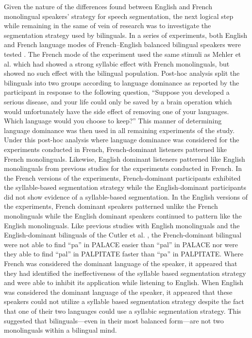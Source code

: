 \documentclass[
12pt, %
english, %
doublespacing, %
nolistspacing, %
liststotoc, %
headsepline, %
chapterinoneline, %
openany, %
]{DoctoralThesis}\usepackage[]{graphicx}\usepackage[]{color}
\begin{document}
Given the nature of the differences found between English and French monolingual speakers’ strategy for speech segmentation, the next logical step while remaining in the same of vein of research was to investigate the segmentation strategy used by bilinguals. In a series of experiments, both English and French language modes of French–English balanced bilingual speakers were tested \parencite{Cutler1992-qq}. The French mode of the experiment used the same stimuli as Mehler et al. \parencite*{Mehler1981-vi} which had showed a strong syllabic effect with French monolinguals, but showed no such effect with the bilingual population. Post-hoc analysis split the bilinguals into two groups according to language dominance as reported by the participant in response to the following question, “Suppose you developed a serious disease, and your life could only be saved by a brain operation which would unfortunately have the side effect of removing one of your languages. Which language would you choose to keep?” This manner of determining language dominance was then used in all remaining experiments of the study. Under this post-hoc analysis where language dominance was considered for the experiments conducted in French, French-dominant listeners patterned like French monolinguals. Likewise, English dominant listeners patterned like English monolinguals from previous studies for the experiments conducted in French. In the French versions of the experiments, French-dominant participants exhibited the syllable-based segmentation strategy while the English-dominant participants did not show evidence of a syllable-based segmentation.  In the English versions of the experiments, French dominant speakers patterned unlike the French monolinguals while the English dominant speakers continued to pattern like the English monolinguals. Like previous studies with English monolinguals and the English-dominant bilinguals of the Cutler et al. \parencite*{Cutler1986-zl}, the French-dominant bilingual were not able to find “pa” in PALACE easier than “pal” in PALACE nor were they able to find “pal” in PALPITATE faster than “pa” in PALPITATE. Where French was considered the dominant language of the speaker, it appeared that they had identified the ineffectiveness of the syllable based segmentation strategy and were able to inhibit its application while listening to English. When English was considered the dominant language of the speaker, it appeared that these speakers could not utilize a syllable based segmentation strategy despite the fact that one of their two languages could use a syllabic segmentation strategy.  This suggested that bilinguals—even in their most balanced form—are not two monolinguals within a bilingual mind.
\end{document}
